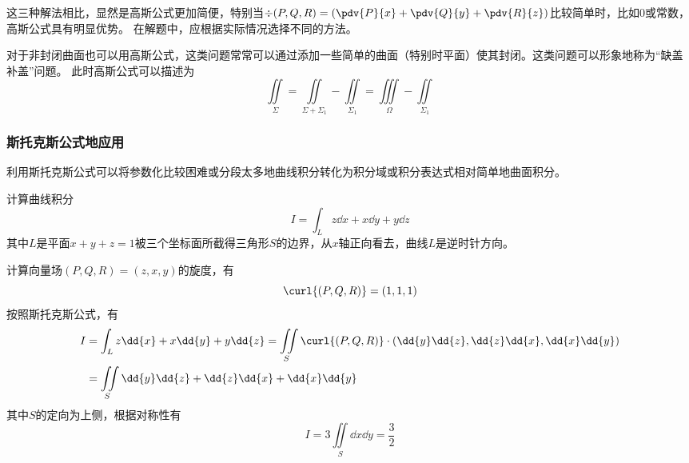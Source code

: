 这三种解法相比，显然是高斯公式更加简便，特别当$\div{(P,Q,R)} = \left(\pdv{P}{x}+\pdv{Q}{y}+\pdv{R}{z}\right)$比较简单时，比如$0$或常数，高斯公式具有明显优势。
在解题中，应根据实际情况选择不同的方法。

对于非封闭曲面也可以用高斯公式，这类问题常常可以通过添加一些简单的曲面（特别时平面）使其封闭。这类问题可以形象地称为“缺盖补盖”问题。
此时高斯公式可以描述为
\[ \iint\limits_\Sigma = \iint\limits_{\Sigma+\Sigma_1} - \iint\limits_{\Sigma_1} = \iiint\limits_\Omega - \iint\limits_{\Sigma_1} \]

\subsubsection{斯托克斯公式地应用}
利用斯托克斯公式可以将参数化比较困难或分段太多地曲线积分转化为积分域或积分表达式相对简单地曲面积分。

\begin{example}
    计算曲线积分
    \[ I = \int_L z\dd{x} + x\dd{y} + y\dd{z} \]
    其中$L$是平面$x+y+z=1$被三个坐标面所截得三角形$S$的边界，从$x$轴正向看去，曲线$L$是逆时针方向。
\end{example}
\begin{solution}
    计算向量场$(P,Q,R)=(z,x,y)$的旋度，有
    \[ \curl{(P,Q,R)} = (1,1,1) \]
    按照斯托克斯公式，有
    \begin{align*}
        I & = \int_L z\dd{x} + x\dd{y} + y\dd{z}
        = \iint\limits_S \curl{(P,Q,R)}\cdot(\dd{y}\dd{z},\dd{z}\dd{x},\dd{x}\dd{y}) \\
          & = \iint\limits_S \dd{y}\dd{z} + \dd{z}\dd{x} + \dd{x}\dd{y}              \\
    \end{align*}
    其中$S$的定向为上侧，根据对称性有
    \[ I = 3\iint\limits_S \dd{x}\dd{y} = \frac{3}{2} \]
\end{solution}

